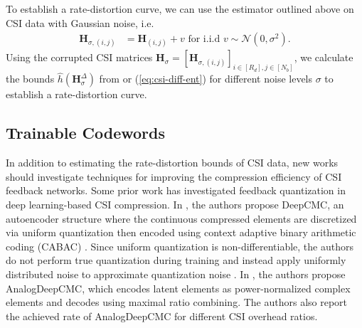To establish a rate-distortion curve, we can use the estimator outlined above on CSI data with Gaussian noise, i.e.
\begin{align*}
	\mathbf H_{\sigma,(i,j)} &= \mathbf H_{(i,j)} + v \text{ for i.i.d } v \sim \mathcal{N}(0,\sigma^2).
\end{align*}
Using the corrupted CSI matrices $\mathbf H_{\sigma}=\left[\mathbf H_{\sigma,(i,j)}\right]_{i\in [R_d],j\in [N_b]}$, we calculate the bounds $\hat h(\mathbf H_{\sigma}^\Delta)$ from or (\ref{eq:csi-diff-ent}) for different noise levels $\sigma$ to establish a rate-distortion curve.

\subsection{Trainable Codewords}

In addition to estimating the rate-distortion bounds of CSI data, new works should investigate techniques for improving the compression efficiency of CSI feedback networks. Some prior work has investigated feedback quantization in deep learning-based CSI compression. In \cite{ref:Yang2019DeepCMC}, the authors propose DeepCMC, an autoencoder structure where the continuous compressed elements are discretized via uniform quantization then encoded using context adaptive binary arithmetic coding (CABAC) \cite{ref:Marpe2003CABAC}. Since uniform quantization is non-differentiable, the authors do not perform true quantization during training and instead apply uniformly distributed noise to approximate quantization noise \cite{ref:Yang2019DeepCMC}. In \cite{ref:Mashhadi2020AnalogDeepCMC}, the authors propose AnalogDeepCMC, which encodes latent elements as power-normalized complex elements and decodes using maximal ratio combining. The authors also report the achieved rate of AnalogDeepCMC for different CSI overhead ratios.

